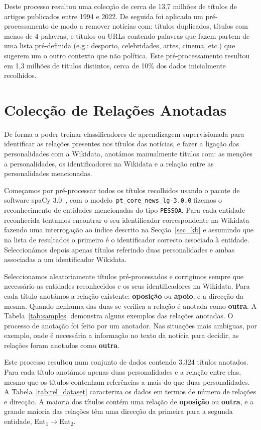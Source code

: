 \documentclass[a4paper, twocolumn, 11pt, twoside]{article}
\begin{document}
Deste processo resultou uma colecção de cerca de 13,7 milhões de títulos de artigos publicados entre 1994 e 2022. De seguida foi aplicado um pré-processamento de modo a remover notícias com: títulos duplicados, títulos com menos de 4 palavras, e títulos ou URLs contendo palavras que fazem partem de uma lista pré-definida (e.g.: desporto, celebridades, artes, cinema, etc.) que sugerem um o outro contexto que não política. Este pré-processamento resultou em 1,3 milhões de títulos distintos, cerca de 10\% dos dados inicialmente recolhidos.

\section{Colecção de Relações Anotadas}
\label{sec:rel_data_annot}

De forma a poder treinar classificadores de aprendizagem supervisionada para identificar as relações presentes nos títulos das notícias, e fazer a ligação das personalidades com a Wikidata, anotámos manualmente títulos com: as menções a personalidades, os identificadores na Wikidata e a relação entre as personalidades mencionadas.

Começamos por pré-processar todos os títulos recolhidos usando o pacote de software spaCy 3.0~\citep{spacy}, com o modelo~\texttt{pt\_core\_news\_lg-3.0.0} fizemos o reconhecimento de entidades mencionadas do tipo \texttt{PESSOA}. Para cada entidade reconhecida tentamos encontrar o seu identificador correspondente na Wikidata fazendo uma interrogação ao índice descrito na Secção~\ref{sec_kb} e assumindo que na lista de resultados o primeiro é o identificador correcto associado à entidade. Seleccionámos depois apenas títulos referindo duas personalidades e ambas associadas a um identificador Wikidata.

Seleccionamos aleatoriamente títulos pré-processados e corrigimos sempre que necessário as entidades reconhecidos e os seus identificadores na Wikidata. Para cada título anotámos a relação existente: \textbf{oposição} ou \textbf{apoio}, e a direcção da mesma. Quando nenhuma das duas se verifica a relação é anotada como \textbf{outra}. A Tabela~\ref{tab:samples} demonstra alguns exemplos das relações anotadas. O processo de anotação foi feito por um anotador. Nas situações mais ambíguas, por exemplo, onde é necessária a informação no texto da notícia para decidir, as relações foram anotados como \textbf{outra}.

Este processo resultou num conjunto de dados contendo 3.324 títulos anotados. Para cada título anotámos apenas duas personalidades e a relação entre elas, mesmo que os títulos contenham referências a mais do que duas personalidades. A Tabela~\ref{tab:rel_dataset} caracteriza os dados em termos de número de relações e direcção. A maioria dos títulos contém uma relação de \textbf{oposição} ou \textbf{outra}, e a grande maioria das relações têm uma direcção da primeira para a segunda entidade, Ent\textsubscript{1}$\rightarrow$Ent\textsubscript{2}.
\end{document}
